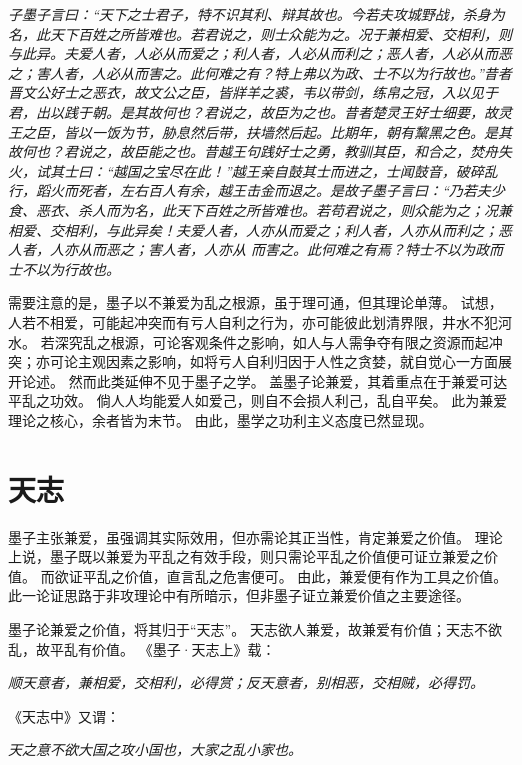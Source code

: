 \documentclass[11pt]{article}
\begin{document}
\textit{子墨子言曰：“天下之士君子，特不识其利、辩其故也。今若夫攻城野战，杀身为名，此天下百姓之所皆难也。若君说之，则士众能为之。况于兼相爱、交相利，则与此异。夫爱人者，人必从而爱之；利人者，人必从而利之；恶人者，人必从而恶之；害人者，人必从而害之。此何难之有？特上弗以为政、士不以为行故也。”昔者晋文公好士之恶衣，故文公之臣，皆牂羊之裘，韦以带剑，练帛之冠，入以见于君，出以践于朝。是其故何也？君说之，故臣为之也。昔者楚灵王好士细要，故灵王之臣，皆以一饭为节，胁息然后带，扶墙然后起。比期年，朝有黧黑之色。是其故何也？君说之，故臣能之也。昔越王句践好士之勇，教驯其臣，和合之，焚舟失火，试其士曰：“越国之宝尽在此！”越王亲自鼓其士而进之，士闻鼓音，破碎乱行，蹈火而死者，左右百人有余，越王击金而退之。是故子墨子言曰：“乃若夫少食、恶衣、杀人而为名，此天下百姓之所皆难也。若苟君说之，则众能为之；况兼相爱、交相利，与此异矣！夫爱人者，人亦从而爱之；利人者，人亦从而利之；恶人者，人亦从而恶之；害人者，人亦从 而害之。此何难之有焉？特士不以为政而士不以为行故也。}

\par

需要注意的是，墨子以不兼爱为乱之根源，虽于理可通，但其理论单薄。
试想，人若不相爱，可能起冲突而有亏人自利之行为，亦可能彼此划清界限，井水不犯河水。
若深究乱之根源，可论客观条件之影响，如人与人需争夺有限之资源而起冲突；亦可论主观因素之影响，如将亏人自利归因于人性之贪婪，就自觉心一方面展开论述。
然而此类延伸不见于墨子之学。
盖墨子论兼爱，其着重点在于兼爱可达平乱之功效。
倘人人均能爱人如爱己，则自不会损人利己，乱自平矣。
此为兼爱理论之核心，余者皆为末节。
由此，墨学之功利主义态度已然显现。

\section{天志}
墨子主张兼爱，虽强调其实际效用，但亦需论其正当性，肯定兼爱之价值。
理论上说，墨子既以兼爱为平乱之有效手段，则只需论平乱之价值便可证立兼爱之价值。
而欲证平乱之价值，直言乱之危害便可。
由此，兼爱便有作为工具之价值。
此一论证思路于非攻理论中有所暗示，但非墨子证立兼爱价值之主要途径。

\par

墨子论兼爱之价值，将其归于“天志”。
天志欲人兼爱，故兼爱有价值；天志不欲乱，故平乱有价值。
《墨子·天志上》载：

\textit{顺天意者，兼相爱，交相利，必得赏；反天意者，别相恶，交相贼，必得罚。}

《天志中》又谓：

\textit{天之意不欲大国之攻小国也，大家之乱小家也。}
\end{document}
